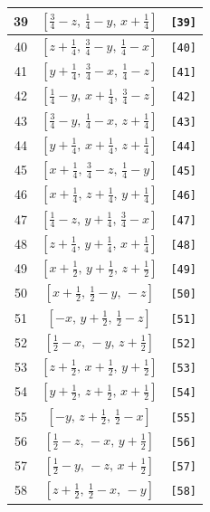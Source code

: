 \documentclass[fleqn,8pt]{jsarticle}
\begin{document}
\begin{longtable}{ccc}
39 & $\left[ \frac{3}{4} - z,\, \frac{1}{4} - y,\, x + \frac{1}{4} \right]$ & {\tt [39]} \\ \hline
40 & $\left[ z + \frac{1}{4},\, \frac{3}{4} - y,\, \frac{1}{4} - x \right]$ & {\tt [40]} \\ \hline
41 & $\left[ y + \frac{1}{4},\, \frac{3}{4} - x,\, \frac{1}{4} - z \right]$ & {\tt [41]} \\ \hline
42 & $\left[ \frac{1}{4} - y,\, x + \frac{1}{4},\, \frac{3}{4} - z \right]$ & {\tt [42]} \\ \hline
43 & $\left[ \frac{3}{4} - y,\, \frac{1}{4} - x,\, z + \frac{1}{4} \right]$ & {\tt [43]} \\ \hline
44 & $\left[ y + \frac{1}{4},\, x + \frac{1}{4},\, z + \frac{1}{4} \right]$ & {\tt [44]} \\ \hline
45 & $\left[ x + \frac{1}{4},\, \frac{3}{4} - z,\, \frac{1}{4} - y \right]$ & {\tt [45]} \\ \hline
46 & $\left[ x + \frac{1}{4},\, z + \frac{1}{4},\, y + \frac{1}{4} \right]$ & {\tt [46]} \\ \hline
47 & $\left[ \frac{1}{4} - z,\, y + \frac{1}{4},\, \frac{3}{4} - x \right]$ & {\tt [47]} \\ \hline
48 & $\left[ z + \frac{1}{4},\, y + \frac{1}{4},\, x + \frac{1}{4} \right]$ & {\tt [48]} \\ \hline
49 & $\left[ x + \frac{1}{2},\, y + \frac{1}{2},\, z + \frac{1}{2} \right]$ & {\tt [49]} \\ \hline
50 & $\left[ x + \frac{1}{2},\, \frac{1}{2} - y,\, - z \right]$ & {\tt [50]} \\ \hline
51 & $\left[ - x,\, y + \frac{1}{2},\, \frac{1}{2} - z \right]$ & {\tt [51]} \\ \hline
52 & $\left[ \frac{1}{2} - x,\, - y,\, z + \frac{1}{2} \right]$ & {\tt [52]} \\ \hline
53 & $\left[ z + \frac{1}{2},\, x + \frac{1}{2},\, y + \frac{1}{2} \right]$ & {\tt [53]} \\ \hline
54 & $\left[ y + \frac{1}{2},\, z + \frac{1}{2},\, x + \frac{1}{2} \right]$ & {\tt [54]} \\ \hline
55 & $\left[ - y,\, z + \frac{1}{2},\, \frac{1}{2} - x \right]$ & {\tt [55]} \\ \hline
56 & $\left[ \frac{1}{2} - z,\, - x,\, y + \frac{1}{2} \right]$ & {\tt [56]} \\ \hline
57 & $\left[ \frac{1}{2} - y,\, - z,\, x + \frac{1}{2} \right]$ & {\tt [57]} \\ \hline
58 & $\left[ z + \frac{1}{2},\, \frac{1}{2} - x,\, - y \right]$ & {\tt [58]} \\ \hline

\end{longtable}
\end{document}
